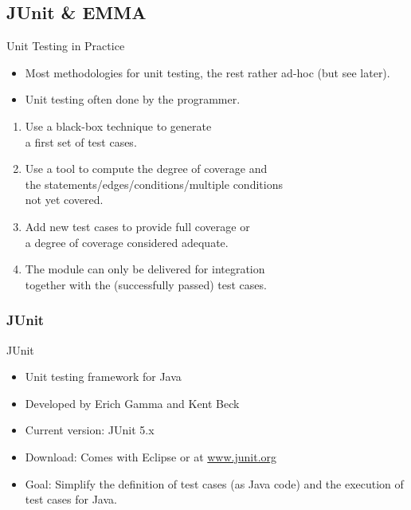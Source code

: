 \subsection*{JUnit \& EMMA}

\begin{Frame}{Unit Testing in Practice}
  \begin{itemize}
    \item Most methodologies for unit testing, the rest rather ad-hoc (but see later).
    \item Unit testing often done by the programmer.
  \end{itemize}

  \begin{enumerate}
    \item Use a black-box technique to generate\\
      a first set of test cases.
    \item Use a tool to compute the degree of coverage and\\
      the statements/edges/conditions/multiple conditions\\
      not yet covered.
    \item Add new test cases to provide full coverage or\\
      a degree of coverage considered adequate.
    \item The module can only be delivered for integration\\
      together with the (successfully passed) test cases.
  \end{enumerate}
\end{Frame}



\subsubsection*{JUnit}

\begin{frame}{JUnit}
  \begin{itemize}
    \item Unit testing framework for Java
    \item Developed by Erich Gamma and Kent Beck
    \item Current version: JUnit 5.x 
    \item Download: Comes with Eclipse or at \href{http://www.junit.org}{www.junit.org}
    \item Goal: Simplify the definition of test cases (as Java code) and the execution of test cases for Java.
  \end{itemize} 
\end{frame}

